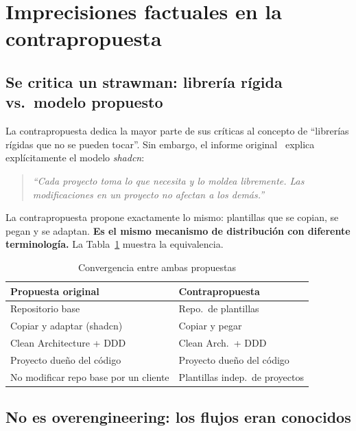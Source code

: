 \documentclass[conference]{IEEEtran}
\begin{document}
\section{Imprecisiones factuales en la contrapropuesta}

\subsection{Se critica un strawman: librer\'ia r\'igida vs.\ modelo propuesto}

La contrapropuesta dedica la mayor parte de sus cr\'iticas al
concepto de ``librer\'ias r\'igidas que no se pueden tocar''. Sin
embargo, el informe original~\cite{gutierrez2026} explica
expl\'icitamente el modelo \textit{shadcn}:

\begin{quote}
\textit{``Cada proyecto toma lo que necesita y lo moldea
libremente. Las modificaciones en un proyecto no afectan a los
dem\'as.''}~\cite{gutierrez2026}
\end{quote}

La contrapropuesta propone exactamente lo mismo: plantillas que
se copian, se pegan y se adaptan. \textbf{Es el mismo mecanismo de
distribuci\'on con diferente terminolog\'ia.} La Tabla~\ref{tab:convergencia}
muestra la equivalencia.

\begin{table}[H]
\centering
\caption{Convergencia entre ambas propuestas}
\label{tab:convergencia}
\small
\begin{tabularx}{\columnwidth}{>{\raggedright\arraybackslash}X >{\raggedright\arraybackslash}X}
\toprule
\textbf{Propuesta original} & \textbf{Contrapropuesta} \\
\midrule
Repositorio base & Repo.\ de plantillas \\
Copiar y adaptar (shadcn) & Copiar y pegar \\
Clean Architecture + DDD & Clean Arch.\ + DDD \\
Proyecto due\~no del c\'odigo & Proyecto due\~no del c\'odigo \\
No modificar repo base por un cliente & Plantillas indep.\ de proyectos \\
\bottomrule
\end{tabularx}
\end{table}

\subsection{No es overengineering: los flujos eran conocidos}
\end{document}
